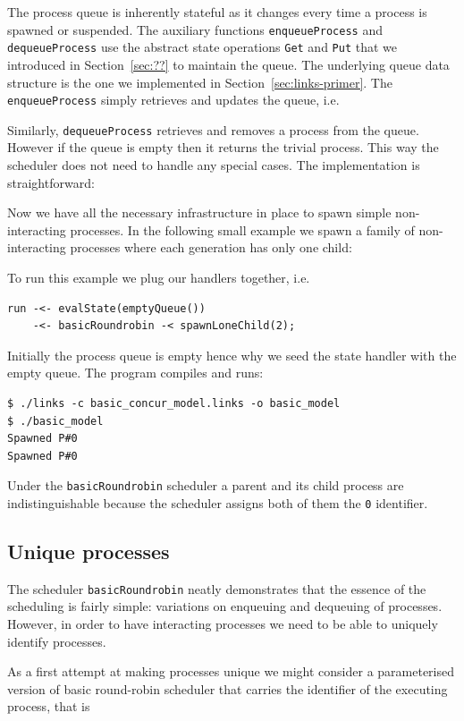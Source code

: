 \documentclass[12pt,mscres,cdtppar,twoside,openright,logo,rightchapter,normalheadings]{infthesis}
\newcommand{\snippet}[1]{}
\theoremstyle{definition}
\begin{document}
The process queue is inherently stateful as it changes every time a
process is spawned or suspended.  The auxiliary functions
\lstinline$enqueueProcess$ and \lstinline$dequeueProcess$ use the
abstract state operations \lstinline$Get$ and \lstinline$Put$ that we
introduced in Section~\ref{sec:??} to maintain the queue. The
underlying queue data structure is the one we implemented in
Section~\ref{sec:links-primer}. The \lstinline$enqueueProcess$ simply
retrieves and updates the queue, i.e.
%
\snippet{enqueueProcess.links}
%
Similarly, \lstinline$dequeueProcess$ retrieves and removes a process
from the queue. However if the queue is empty then it returns the
trivial process. This way the scheduler does not need to handle any
special cases. The implementation is straightforward:
%
\snippet{dequeueProcess.links}
%
Now we have all the necessary infrastructure in place to spawn simple
non-interacting processes. In the following small example we spawn a
family of non-interacting processes where each generation has only one
child:
%
\snippet{spawnLoneChild.links}
%
To run this example we plug our handlers together, i.e.
%
\begin{lstlisting}
run -<- evalState(emptyQueue()) 
    -<- basicRoundrobin -< spawnLoneChild(2);
\end{lstlisting}
%
Initially the process queue is empty hence why we seed the state
handler with the empty queue. The program compiles and runs:
%
\begin{lstlisting}[style=terminal]
$ ./links -c basic_concur_model.links -o basic_model
$ ./basic_model
Spawned P#0
Spawned P#0
\end{lstlisting}
%
Under the \lstinline$basicRoundrobin$ scheduler a parent and its child
process are indistinguishable because the scheduler assigns both of
them the \lstinline$0$ identifier.

\subsection{Unique processes}

The scheduler \lstinline$basicRoundrobin$ neatly demonstrates that the
essence of the scheduling is fairly simple: variations on enqueuing
and dequeuing of processes. However, in order to have interacting
processes we need to be able to uniquely identify processes. 

As a first attempt at making processes unique we might consider a
parameterised version of basic round-robin scheduler that carries the
identifier of the executing process, that is
\end{document}
